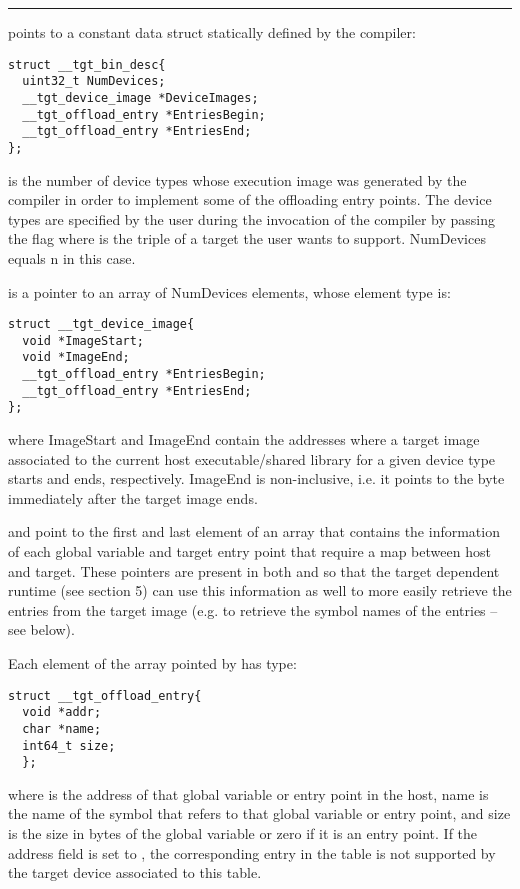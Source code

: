 \noindent\rule{\textwidth}{0.4pt}

 points to a constant data struct statically defined by the compiler:
\begin{lstlisting}
struct __tgt_bin_desc{
  uint32_t NumDevices; 
  __tgt_device_image *DeviceImages; 
  __tgt_offload_entry *EntriesBegin;
  __tgt_offload_entry *EntriesEnd; 
};
\end{lstlisting}

 is the number of device types whose execution image was generated by the compiler in order to implement some of the offloading entry points. The device types are specified by the user during the invocation of the compiler by passing the flag  where  is the triple of a target the user wants to support. NumDevices equals n in this case. 

 is a pointer to an array of NumDevices elements, whose element type is:
\begin{lstlisting}
struct __tgt_device_image{
  void *ImageStart;
  void *ImageEnd;
  __tgt_offload_entry *EntriesBegin;
  __tgt_offload_entry *EntriesEnd; 
};
\end{lstlisting}
%
where ImageStart and ImageEnd contain the addresses where a target image associated to the current host executable/shared library for a given device type starts and ends, respectively. ImageEnd is non-inclusive, i.e. it points to the byte immediately after the target image ends.

 and  point to the first and last element of an array that contains the information of each global variable and target entry point that require a map between host and target. These pointers are present in both  and  so that the target dependent runtime (see section 5) can use this information as well to more easily retrieve the entries from the target image (e.g. to retrieve the symbol names of the entries – see below). 

Each element of the array pointed by  has type:
\begin{lstlisting}
struct __tgt_offload_entry{
  void *addr;
  char *name;
  int64_t size;
  };
\end{lstlisting}
%
where  is the address of that global variable or entry point in the host, name is the name of the 
symbol that refers to that global variable or entry point, and size is the size in bytes of the global variable or zero if it is an entry point. If the address field is set to , the corresponding entry in the table is not supported by the target device associated to this table.

